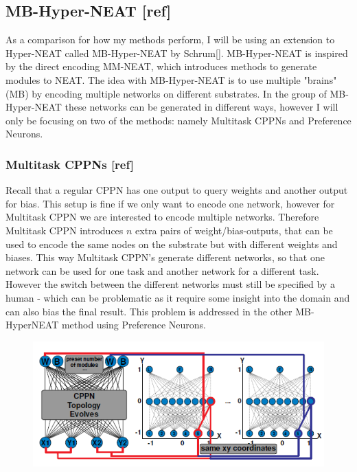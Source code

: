 \documentclass[11pt, a4paper]{article}
\begin{document}
\subsection{MB-Hyper-NEAT [ref]}
As a comparison for how my methods perform, I will be  using an extension to Hyper-NEAT called MB-Hyper-NEAT by Schrum[]. MB-Hyper-NEAT is inspired by the direct encoding MM-NEAT, which introduces methods to generate modules to NEAT. The idea with MB-Hyper-NEAT is to use multiple "brains" (MB) by encoding multiple networks on different substrates. In the group of MB-Hyper-NEAT these networks can be generated in different ways, however I will only be focusing on two of the methods: namely Multitask CPPNs and Preference Neurons.
\newpage
\subsubsection{Multitask CPPNs [ref]}
Recall that a regular CPPN has one output to query weights and another output for bias. This setup is fine if we only want to encode one network, however for Multitask CPPN we are interested to encode multiple networks. Therefore Multitask CPPN introduces $ n $ extra pairs of weight/bias-outputs, that can be used to encode the same nodes on the substrate but with different weights and biases. This way Multitask CPPN's generate different networks, so that one network can be used for one task and another network for a different task. However the switch between the different networks must still be specified by a human - which can be problematic as it require some insight into the domain and can also bias the final result. This problem is addressed in the other MB-HyperNEAT method using Preference Neurons.
\begin{figure}[!ht]
\centering
\includegraphics[scale=0.6]{MultitaskCPPN}
\caption{}
\end{figure}
\end{document}
